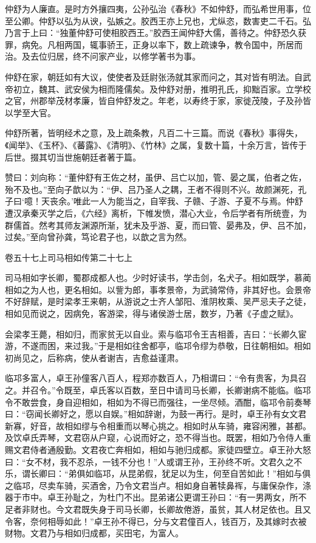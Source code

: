 \documentclass[12pt,UTF8]{ctexbook}
\begin{document}
仲舒为人廉直。是时方外攘四夷，公孙弘治《春秋》不如仲舒，而弘希世用事，位至公卿。仲舒以弘为从谀，弘嫉之。胶西王亦上兄也，尤纵恣，数害吏二千石。弘乃言于上曰：“独董仲舒可使相胶西王。”胶西王闻仲舒大儒，善待之。仲舒恐久获罪，病免。凡相两国，辄事骄王，正身以率下，数上疏谏争，教令国中，所居而治。及去位归居，终不问家产业，以修学著书为事。



仲舒在家，朝廷如有大议，使使者及廷尉张汤就其家而问之，其对皆有明法。自武帝初立，魏其、武安侯为相而隆儒矣。及仲舒对册，推明孔氏，抑黜百家。立学校之官，州郡举茂材孝廉，皆自仲舒发之。年老，以寿终于家，家徙茂陵，子及孙皆以学至大官。



仲舒所著，皆明经术之意，及上疏条教，凡百二十三篇。而说《春秋》事得失，《闻举》、《玉杯》、《蕃露》、《清明》、《竹林》之属，复数十篇，十余万言，皆传于后世。掇其切当世施朝廷者著于篇。



赞曰：刘向称：“董仲舒有王佐之材，虽伊、吕亡以加，管、晏之属，伯者之佐，殆不及也。”至向子歆以为：“伊、吕乃圣人之耦，王者不得则不兴。故颜渊死，孔子曰‘噫！天丧余。’唯此一人为能当之，自宰我、子赣、子游、子夏不与焉。仲舒遭汉承秦灭学之后，《六经》离析，下帷发愤，潜心大业，令后学者有所统壹，为群儒首。然考其师友渊源所渐，犹未及乎游、夏，而曰管、晏弗及，伊、吕不加，过矣。”至向曾孙龚，笃论君子也，以歆之言为然。





卷五十七上司马相如传第二十七上



司马相如字长卿，蜀郡成都人也。少时好读书，学击剑，名犬子。相如既学，慕蔺相如之为人也，更名相如。以訾为郎，事孝景帝，为武骑常侍，非其好也。会景帝不好辞赋，是时梁孝王来朝，从游说之士齐人邹阳、淮阴枚乘、吴严忌夫子之徒，相如见而说之，因病免，客游梁，得与诸侯游士居，数岁，乃著《子虚之赋》。



会梁孝王薨，相如归，而家贫无以自业。索与临邛令王吉相善，吉曰：“长卿久宦游，不遂而困，来过我。”于是相如往舍都亭，临邛令缪为恭敬，日往朝相如。相如初尚见之，后称病，使从者谢吉，吉愈益谨肃。



临邛多富人，卓王孙僮客八百人，程郑亦数百人，乃相谓曰：“令有贵客，为具召之。并召令。”令既至，卓氏客以百数，至日中请司马长卿，长卿谢病不能临。临邛令不敢尝食，身自迎相如，相如为不得已而强往，一坐尽倾。酒酣，临邛令前奏琴曰：“窃闻长卿好之，愿以自娱。”相如辞谢，为鼓一再行。是时，卓王孙有女文君新寡，好音，故相如缪与令相重而以琴心挑之。相如时从车骑，雍容闲雅，甚都。及饮卓氏弄琴，文君窃从户窥，心说而好之，恐不得当也。既罢，相如乃令侍人重赐文君侍者通殷勤。文君夜亡奔相如，相如与驰归成都。家徒四壁立。卓王孙大怒曰：“女不材，我不忍杀，一钱不分也！”人或谓王孙，王孙终不听。文君久之不乐，谓长卿曰：“弟俱如临邛，从昆弟假，犹足以为生，何至自苦如此！”相如与俱之临邛，尽卖车骑，买酒舍，乃令文君当卢。相如身自著犊鼻裈，与庸保杂作，涤器于市中。卓王孙耻之，为杜门不出。昆弟诸公更谓王孙曰：“有一男两女，所不足者非财也。今文君既失身于司马长卿，长卿故倦游，虽贫，其人材足依也。且又令客，奈何相辱如此！”卓王孙不得已，分与文君僮百人，钱百万，及其嫁时衣被财物。文君乃与相如归成都，买田宅，为富人。
\end{document}
